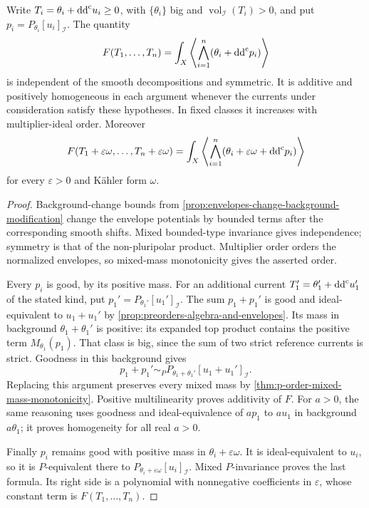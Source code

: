 \begin{lemma}\label{lem:positive-multiplier-volume-polarization}
Write $T_i=\theta_i+\mathrm{dd}^{\mathrm{c}} u_i\geq0$, with $\{\theta_i\}$ big and $\operatorname{vol}_{\mathcal I}(T_i)>0$, and put $p_i=P_{\theta_i}[u_i]_{\mathcal I}$. The quantity
\[
 F(T_1,\ldots,T_n)=\int_X\left\langle\bigwedge_{i=1}^n(\theta_i+\mathrm{dd}^{\mathrm{c}} p_i)\right\rangle
\]
is independent of the smooth decompositions and symmetric. It is additive and positively homogeneous in each argument whenever the currents under consideration satisfy these hypotheses. In fixed classes it increases with multiplier-ideal order. Moreover
\[
 F(T_1+\varepsilon\omega,\ldots,T_n+\varepsilon\omega)
 =\int_X\left\langle\bigwedge_{i=1}^n(\theta_i+\varepsilon\omega+\mathrm{dd}^{\mathrm{c}} p_i)\right\rangle
\]
for every $\varepsilon>0$ and K\"ahler form $\omega$.
\end{lemma}
\begin{proof}
Background-change bounds from \cref{prop:envelopes-change-background-modification} change the envelope potentials by bounded terms after the corresponding smooth shifts. Mixed bounded-type invariance gives independence; symmetry is that of the non-pluripolar product. Multiplier order orders the normalized envelopes, so mixed-mass monotonicity gives the asserted order.

Every $p_i$ is good, by its positive mass. For an additional current $T_1'=\theta_1'+\mathrm{dd}^{\mathrm{c}} u_1'$ of the stated kind, put $p_1'=P_{\theta_1'}[u_1']_{\mathcal I}$. The sum $p_1+p_1'$ is good and ideal-equivalent to $u_1+u_1'$ by \cref{prop:preorders-algebra-and-envelopes}. Its mass in background $\theta_1+\theta_1'$ is positive: its expanded top product contains the positive term $M_{\theta_1}(p_1)$. That class is big, since the sum of two strict reference currents is strict. Goodness in this background gives
\[
 p_1+p_1'\sim_P P_{\theta_1+\theta_1'}[u_1+u_1']_{\mathcal I}.
\]
Replacing this argument preserves every mixed mass by \cref{thm:p-order-mixed-mass-monotonicity}. Positive multilinearity proves additivity of $F$. For $a>0$, the same reasoning uses goodness and ideal-equivalence of $ap_1$ to $au_1$ in background $a\theta_1$; it proves homogeneity for all real $a>0$.

Finally $p_i$ remains good with positive mass in $\theta_i+\varepsilon\omega$. It is ideal-equivalent to $u_i$, so it is $P$-equivalent there to $P_{\theta_i+\varepsilon\omega}[u_i]_{\mathcal I}$. Mixed $P$-invariance proves the last formula. Its right side is a polynomial with nonnegative coefficients in $\varepsilon$, whose constant term is $F(T_1,\ldots,T_n)$.
\end{proof}

